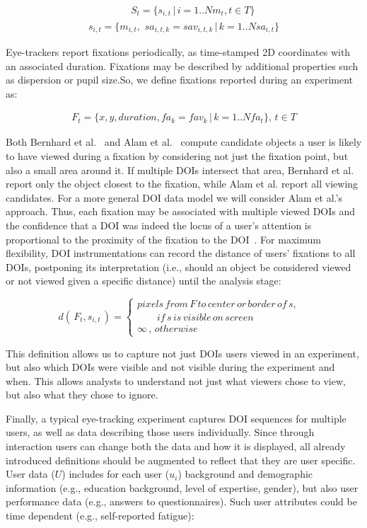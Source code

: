 \vspace{-3mm}
\begin{multline*}
\qquad\qquad\; S_t = \{s_{i,t} \,|\, i=1..N\!m_t, t \in T\} \\
s_{i,t} = \{m_{i,t}, \,\, sa_{i,t,k} = sav_{i,t,k} \,|\, k=1..N\!sa_{i,t}\}
\end{multline*}

Eye-trackers report fixations periodically, as time-stamped 2D coordinates with an associated duration. Fixations may be described by additional properties such as dispersion or pupil size.So, we define fixations reported during an experiment as:

\vspace{-5mm}
\begin{multline*}
F_t = \{x, y, duration, fa_{k} = fav_{k} \, | \, k=1..N\!fa_t\}, \, t \in T
\end{multline*}

Both Bernhard et al.~\cite{Bern14} and Alam et al.~\cite{Ala16} compute candidate objects a user is likely to have viewed during a fixation by considering not just the fixation point, but also a small area around it. If multiple DOIs intersect that area, Bernhard et al. report only the object closest to the fixation, while Alam et al. report all viewing candidates.  For a more general DOI data model we will consider Alam et al.'s approach. Thus, each fixation may be associated with multiple viewed DOIs and the confidence that a DOI was indeed the locus of a user's attention is proportional to the proximity of the fixation to the DOI~\cite{Ala16}. For maximum flexibility, DOI instrumentations can record the distance of users' fixations to all DOIs, postponing its interpretation (i.e., should an object be considered viewed or not viewed given a specific distance) until the analysis stage: 


$$
d(\,F_t, s_{i,t}\,) = 
\begin{cases}
pixels\,from\,F\,to\,center\,or\,border\,of\,s, & \\ \qquad if\,s\, is \, visible\,on\,screen \\ 
\infty \, , \, otherwise 
\end{cases}
$$

This definition allows us to capture not just DOIs users viewed in an experiment, but also which DOIs were visible and not visible during the experiment and when. This allows analysts to understand not just what viewers chose to view, but also what they chose to ignore. 

Finally, a typical eye-tracking experiment captures DOI sequences for multiple users, as well as data describing those users individually. Since through interaction users can change both the data and how it is displayed, all already introduced definitions should be augmented to reflect that they are user specific. User data ($U$) includes for each user ($u_i$) background and demographic information (e.g., education background, level of expertise, gender), but also user performance data (e.g., answers to questionnaires). Such user attributes could be time dependent (e.g., self-reported fatigue):

